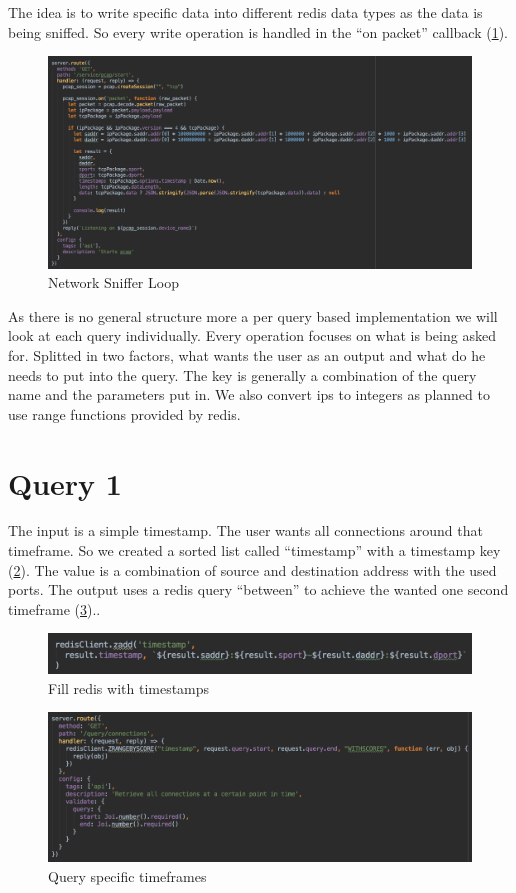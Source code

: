 The idea is to write specific data into different redis data types as the data is being sniffed. So every write operation is handled in the “on packet” callback (\ref{loop}).
  \begin{figure}[htb!]
	\centerline{\includegraphics[width=1.0\textwidth]{resources/solution2-1.png}}
	\caption{Network Sniffer Loop}
		\label{loop}
\end{figure}
As there is no general structure more a per query based implementation we will look at each query individually. Every operation focuses on what is being asked for. Splitted in two factors, what wants the user as an output and what do he needs to put into the query. The key is generally a combination of the query name and the parameters put in. We also convert ips to integers as planned to use range functions provided by redis.

\section{Query 1}
The input is a simple timestamp. The user wants all connections around that timeframe. So we created a sorted list called “timestamp” with a timestamp key (\ref{query1}). The value is a combination of source and destination address with the used ports. The output uses a redis query “between” to achieve the wanted one second timeframe (\ref{query11})..

  \begin{figure}[htb!]
	\centerline{\includegraphics[width=1.0\textwidth]{resources/solution2-2.png}}
	\caption{Fill redis with timestamps}
	\label{query1}
\end{figure}

  \begin{figure}[htb!]
	\centerline{\includegraphics[width=1.0\textwidth]{resources/solution2-3.png}}
	\caption{Query specific timeframes}
	\label{query11}
\end{figure}

